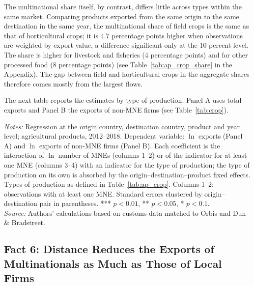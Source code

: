 \documentclass[11pt,a4paper]{article}
\newcommand{\srcnote}{\textit{Source:} Authors' calculations based on customs data matched to Orbis and Dun \& Bradstreet.}
\begin{document}
The multinational share itself, by contrast, differs little across types within the same market.
Comparing products exported from the same origin to the same destination in the same year, the
multinational share of field crops is the same as that of horticultural crops; it is 4.7 percentage
points higher when observations are weighted by export value, a difference significant only at the
10 percent level. The share is higher for livestock and fisheries (4 percentage points) and for
other processed food (8 percentage points) (see Table~\ref{tab:ap_crop_share} in the Appendix). The
gap between field and horticultural crops in the aggregate shares therefore comes mostly from the
largest flows.

The next table reports the estimates by type of production. Panel A uses total exports and Panel B
the exports of non-MNE firms (see Table~\ref{tab:crop}).
\begin{table}[H]\centering\small%
  \caption{Multinational Presence and Agricultural Exports, by Type of Production}%
  \label{tab:crop}%
  \par\vspace{3pt}%
  \begin{minipage}{0.95\textwidth}\footnotesize %
  \textit{Notes:} Regression at the origin country, destination country, product and year level; agricultural products, 2012--2018. Dependent variable: $\ln$ exports (Panel A) and $\ln$ exports of non-MNE firms (Panel B). Each coefficient is the interaction of $\ln$ number of MNEs (columns 1--2) or of the indicator for at least one MNE (columns 3--4) with an indicator for the type of production; the type of production on its own is absorbed by the origin--destination--product fixed effects. Types of production as defined in Table~\ref{tab:ap_crop}. Columns 1--2: observations with at least one MNE. Standard errors clustered by origin--destination pair in parentheses. *** $p<0.01$, ** $p<0.05$, * $p<0.1$.\\[3pt]%
  \srcnote%
  \end{minipage}%
  \end{table}

\subsection{Fact 6: Distance Reduces the Exports of Multinationals as Much as Those of Local Firms}
\end{document}
